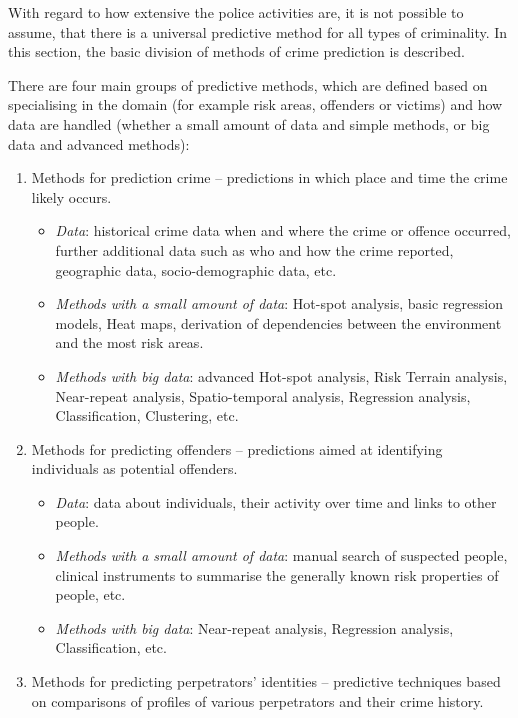 \documentclass[thesis=M,english]{FITthesis}[2012/10/20]
\begin{document}
With regard to how extensive the police activities are, it is not possible to assume, that there is a universal predictive method for all types of criminality. In this section, the basic division of methods of crime prediction is described. 

There are four main groups of predictive methods, which are defined based on specialising in the domain (for example risk areas, offenders or victims) and how data are handled (whether a small amount of data and simple methods, or big data and advanced methods)\cite[8--12]{PP13}:

\begin{enumerate}
    \item Methods for prediction crime -- predictions in which place and time the crime likely occurs.
        \begin{itemize}
            \item \textit{Data}: historical crime data when and where the crime or offence occurred, further additional data such as who and how the crime reported, geographic data, socio-demographic data, etc.
            \item \textit{Methods with a small amount of data}: Hot-spot analysis, basic regression models, Heat maps, derivation of dependencies between the environment and the most risk areas. 
            \item \textit{Methods with big data}: advanced Hot-spot analysis, Risk Terrain analysis, Near-repeat analysis, Spatio-temporal analysis, Regression analysis, Classification, Clustering,  etc. 
        \end{itemize}
    \item Methods for predicting offenders -- predictions aimed at identifying individuals as potential offenders.
        \begin{itemize}
            \item \textit{Data}: data about individuals, their activity over time and links to other people.
            \item \textit{Methods with a small amount of data}: manual search of suspected people, clinical instruments to summarise the generally known risk properties of people, etc.
            \item \textit{Methods with big data}: Near-repeat analysis, Regression analysis, Classification, etc.
        \end{itemize}
    \item Methods for predicting perpetrators' identities -- predictive techniques based on comparisons of profiles of various perpetrators and their crime history.

\end{enumerate}
\end{document}
